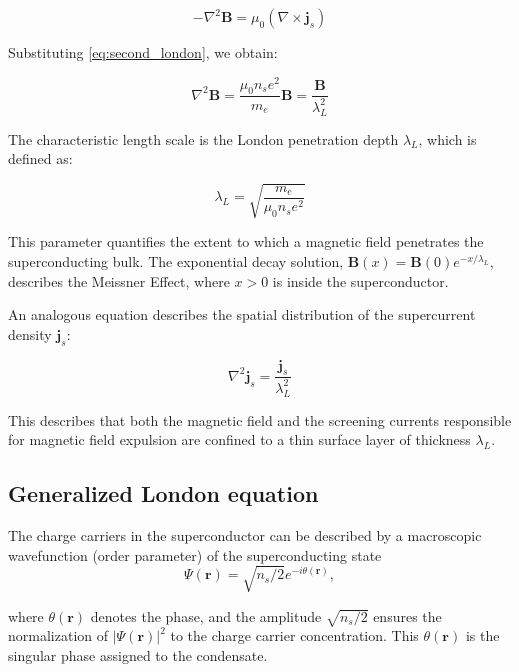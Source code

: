 \begin{equation}
    -\nabla^2 \mathbf{B} = \mu_0 (\nabla \times \mathbf{j}_s)
\end{equation}

Substituting \cref{eq:second_london}, we obtain:

\begin{equation}
    \nabla^2 \mathbf{B} = \frac{\mu_0 n_s e^2}{m_e} \mathbf{B} = \frac{\mathbf{B}}{\lambda_L^2}
\end{equation}

The characteristic length scale is the London penetration depth $\lambda_L$, which is defined as:

\begin{equation}
    \lambda_L = \sqrt{\frac{m_e}{\mu_0 n_s e^2}}
\end{equation}

This parameter quantifies the extent to which a magnetic field penetrates the superconducting bulk. The exponential decay solution, $\mathbf{B}(x) = \mathbf{B}(0) e^{-x/\lambda_L}$, describes the Meissner Effect, where $x>0$ is inside the superconductor.

An analogous equation describes the spatial distribution of the supercurrent density $\mathbf{j}_s$:

\begin{equation}
    \nabla^2 \mathbf{j}_s = \frac{\mathbf{j}_s}{\lambda_L^2}
\end{equation}

This describes that both the magnetic field and the screening currents responsible for magnetic field expulsion are confined to a thin surface layer of thickness $\lambda_L$.

\subsection*{Generalized London equation}
The charge carriers in the superconductor can be described by a macroscopic wavefunction (order parameter) of the superconducting state
\begin{equation}
    \Psi(\mathbf{r}) = \sqrt{n_s/2} e^{-i\theta(\mathbf{r})},
\end{equation}

where $\theta(\mathbf{r})$ denotes the phase, and the amplitude $\sqrt{n_s/2}$ ensures the normalization of $|\Psi(\mathbf{r})|^2$ to the charge carrier concentration. This $\theta(\mathbf{r})$ is the singular phase assigned to the condensate.

